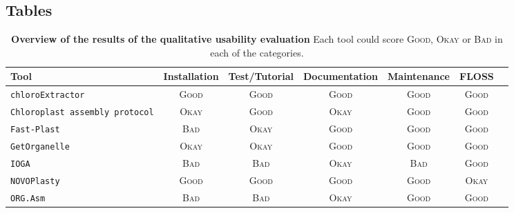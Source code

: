 \documentclass{bmcart}
\newcommand{\formatprogramnames}[1]{\texttt{#1}}
\newcommand{\ce}{\formatprogramnames{chloroExtractor}}
\newcommand{\oa}{\formatprogramnames{ORG.Asm}}
\newcommand{\fp}{\formatprogramnames{Fast-Plast}}
\newcommand{\ioga}{\formatprogramnames{IOGA}}
\newcommand{\np}{\formatprogramnames{NOVOPlasty}}
\newcommand{\go}{\formatprogramnames{GetOrganelle}}
\newcommand{\cassp}{\formatprogramnames{Chloroplast assembly protocol}}
\newcommand{\ok}{\textsc{Okay}}
\newcommand{\bad}{\textsc{Bad}}
\newcommand{\good}{\textsc{Good}}
\begin{document}
\begin{backmatter}
\section*{Tables}
\begin{table}[h!]
    \centering
    \caption{\textbf{Overview of the results of the qualitative usability evaluation} Each tool 
    could score \good{}, \ok{} or \bad{} in each of the categories.}
    \label{tab:resultsQual}
\begin{tabular}{p{3cm}cccccc}   
Tool & Installation & Test/Tutorial & Documentation & Maintenance & FLOSS\\                           \hline \ce{}     &  \good{}  &  \good{}  &  \good{}  &  \good{}  &  \good{} \\
\cassp{}  &  \ok{}    &  \good{}  &  \ok{}    &  \good{}  &  \good{} \\
\fp{}     &  \bad{}   &  \ok{}    &  \good{}  &  \good{}  &  \good{} \\
\go{}     &  \ok{}    &  \ok{}    &  \good{}  &  \good{}  &  \good{} \\
\ioga{}   &  \bad{}   &  \bad{}   &  \ok{}    &  \bad{}    &  \good{}  \\
\np{}     &  \good{}  &  \good{}  &  \good{}  &  \good{}  &  \ok{}   \\
\oa{}     &  \bad{}   &  \bad{}   &  \ok{}    &  \good{}  &  \good{} \\ \hline
\end{tabular}      
\end{table}


\end{backmatter}
\end{document}
